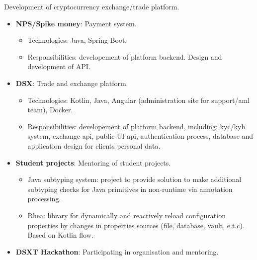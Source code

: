\documentclass{cv}
\begin{document}
\begin{cvblock}{%
		}

	Development of cryptocurrency exchange/trade platform.

	\begin{itemize}
		\item \textbf{NPS/Spike money}: Payment system.
		      \begin{itemize}
			      \item Technologies: Java, Spring Boot.
			      \item Responsibilities: developement of platform backend.
			            Design and development of API.
		      \end{itemize}
		\item \textbf{DSX}: Trade and exchange platform.
		      \begin{itemize}
			      \item Technologies: Kotlin, Java, Angular (administration site for support/aml team), Docker.
			      \item Responsibilities: developement of platform backend, including:
			            kyc/kyb system, exchange api, public UI api, authentication process,
			            database and application design for clients personal data.
		      \end{itemize}
		\item \textbf{Student projects}: Mentoring of student projects.
		      \begin{itemize}
			      \item Java subtyping system: project to provide solution to make additional
			            subtyping checks for Java primitives in non-runtime via annotation processing.
			      \item Rhea: library for dynamically and reactively reload configuration properties
			            by changes in properties sources (file, database, vault, e.t.c). Based on
			            Kotlin flow.
		      \end{itemize}
		\item \textbf{DSXT Hackathon}: Participating in organisation and mentoring.
	\end{itemize}
\end{cvblock}
\end{document}
